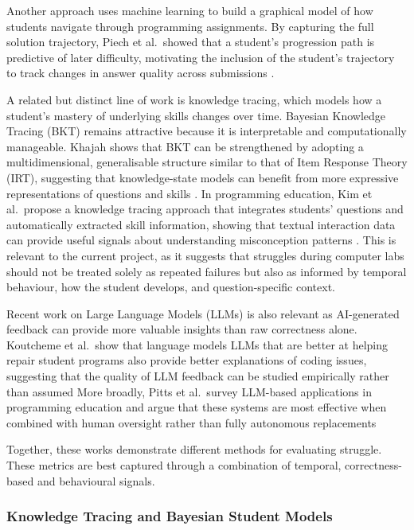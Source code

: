 Another approach uses machine learning to build a graphical model of how students navigate through programming assignments. By capturing the full solution trajectory, Piech et al.\ showed that a student's progression path is predictive of later difficulty, motivating the inclusion of the student's trajectory to track changes in answer quality across submissions \cite{piech_modeling}.

A related but distinct line of work is knowledge tracing, which models how a student's mastery of underlying skills changes over time.
Bayesian Knowledge Tracing (BKT) remains attractive because it is interpretable and computationally manageable.
Khajah shows that BKT can be strengthened by adopting a multidimensional, generalisable structure similar to that of Item Response Theory (IRT), suggesting that knowledge-state models can benefit from more expressive representations of questions and skills \cite{khajah_supercharging}.
In programming education, Kim et al.\ propose a knowledge tracing approach that integrates students' questions and automatically extracted skill information, showing that textual interaction data can provide useful signals about understanding misconception patterns \cite{kim_knowledge}.
This is relevant to the current project, as it suggests that struggles during computer labs should not be treated solely as repeated failures but also as informed by temporal behaviour, how the student develops, and question-specific context.  

Recent work on Large Language Models (LLMs) is also relevant as AI-generated feedback can provide more valuable insights than raw correctness alone.
Koutcheme et al.\ show that language models LLMs that are better at helping repair student programs also provide better explanations of coding issues, suggesting that the quality of LLM feedback can be studied empirically rather than assumed \cite{koutcheme_using}
More broadly, Pitts et al.\ survey LLM-based applications in programming education and argue that these systems are most effective when combined with human oversight rather than fully autonomous replacements \cite{pitts_a}

Together, these works demonstrate different methods for evaluating struggle. These metrics are best captured through a combination of temporal, correctness-based and behavioural signals.

\subsubsection{Knowledge Tracing and Bayesian Student Models}

